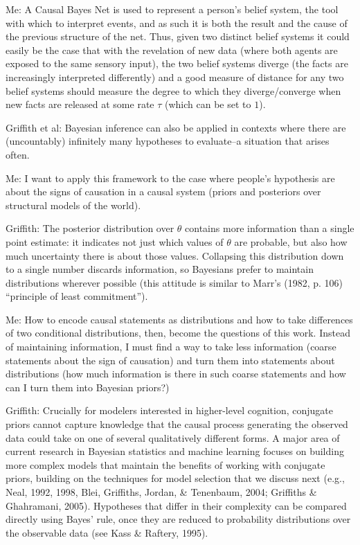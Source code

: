 \documentclass[12pt]{article}
\begin{document}
Me: A Causal Bayes Net is used to represent a person's belief system, the tool with which to  interpret events, and as such it is both the result and the cause of the previous structure of the net. Thus, given two distinct belief systems it could easily be the case that with the revelation of new data (where both agents are exposed to the same sensory input), the two belief systems diverge (the facts are increasingly interpreted differently) and a good measure of distance for any two belief systems should measure the degree to which they diverge/converge when new facts are released at some rate $\tau$ (which can be set to $1$). 

Griffith et al: Bayesian inference can also be applied in contexts where there are (uncountably) infinitely many hypotheses to evaluate--a situation that arises often. 

Me: I want to apply this framework to the case where people's hypothesis are about the signs of causation in a causal system (priors and posteriors over structural models of the world).

Griffith: The posterior distribution over $\theta$ contains more information than a single point estimate: it indicates not just which values of $\theta$ are probable, but also how much uncertainty there is about those values. Collapsing this distribution down to a single number discards information, so Bayesians prefer to maintain distributions wherever possible (this attitude is similar to Marr’s (1982, p. 106) ``principle of least commitment''). 

Me: How to encode causal statements as distributions and how to take differences of two conditional distributions, then, become the questions of this work. Instead of maintaining information, I must find a way to take less information (coarse statements about the sign of causation) and turn them into statements about distributions (how much information is there in such coarse statements and how can I turn them into Bayesian priors?)

Griffith: Crucially for modelers interested in higher-level cognition, conjugate priors cannot capture knowledge that the causal process generating the observed data could take on one of several qualitatively different forms.  A major area of current research in Bayesian statistics and machine learning focuses on building more complex models that maintain the benefits of working with conjugate priors, building on the techniques for model selection that we discuss next (e.g., Neal, 1992, 1998, Blei, Griffiths, Jordan, \& Tenenbaum, 2004; Griffiths \& Ghahramani, 2005). Hypotheses that differ in their complexity can be compared directly using Bayes' rule, once they are reduced to probability distributions over the observable data (see Kass \& Raftery, 1995).
\end{document}

